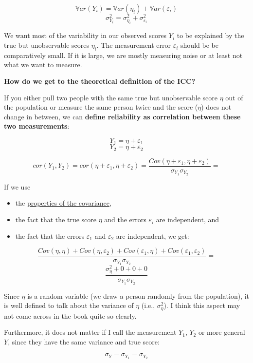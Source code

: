 \documentclass[
]{book}
\providecommand{\tightlist}{%
  \setlength{\itemsep}{0pt}\setlength{\parskip}{0pt}}
\begin{document}
\[\mathbb{V}ar(Y_i) = \mathbb{V}ar(\eta_i) + \mathbb{V}ar(\varepsilon_i)\]
\[\sigma_{Y_i}^2 = \sigma_{\eta_i}^2 + \sigma_{\varepsilon_i}^2\]

We want most of the variability in our observed scores \(Y_i\) to be explained by the
true but unobservable scores \(\eta_i\). The measurement error \(\varepsilon_i\) should be
be comparatively small. If it is large, we are mostly measuring noise or at least not
what we want to measure.

\textbf{How do we get to the theoretical definition of the ICC?}

If you either pull two people with the same true but unobservable score \(\eta\) out of the population
or measure the same person twice and the score (\(\eta\)) does not change in between, we can
\textbf{define reliability as correlation between these two measurements}:

\[Y_1 = \eta + \varepsilon_1\]
\[Y_2 = \eta + \varepsilon_2\]

\[cor(Y_1, Y_2) = cor(\eta + \varepsilon_1, \eta + \varepsilon_2) = \frac{Cov(\eta + \varepsilon_1, \eta + \varepsilon_2)}{\sigma_{Y_1}\sigma_{Y_2}}  =\]

If we use

\begin{itemize}
\tightlist
\item
  the \href{https://en.wikipedia.org/wiki/Covariance\#Properties}{properties of the covariance},
\item
  the fact that the true score \(\eta\) and the errors \(\varepsilon_i\) are independent, and
\item
  the fact that the errors \(\varepsilon_1\) and \(\varepsilon_2\) are independent, we get:
\end{itemize}

\[\frac{Cov(\eta, \eta) + Cov(\eta, \varepsilon_2) + Cov(\varepsilon_1, \eta) + Cov(\varepsilon_1, \varepsilon_2)}{\sigma_{Y_1} \sigma_{Y_2}}  =\]
\[\frac{\sigma_{\eta}^2 + 0 + 0 + 0}{\sigma_{Y_1} \sigma_{Y_2}}\]

Since \(\eta\) is a random variable (we draw a person randomly from the population),
it is well defined to talk about the variance of \(\eta\) (i.e., \(\sigma_{\eta}^2\)).
I think this aspect may not come across in the book quite so clearly.

Furthermore, it does not matter if I call the measurement \(Y_1\), \(Y_2\) or more general
\(Y\), since they have the same variance and true score:

\[\sigma_{Y} = \sigma_{Y_1} = \sigma_{Y_2}\]
\end{document}
